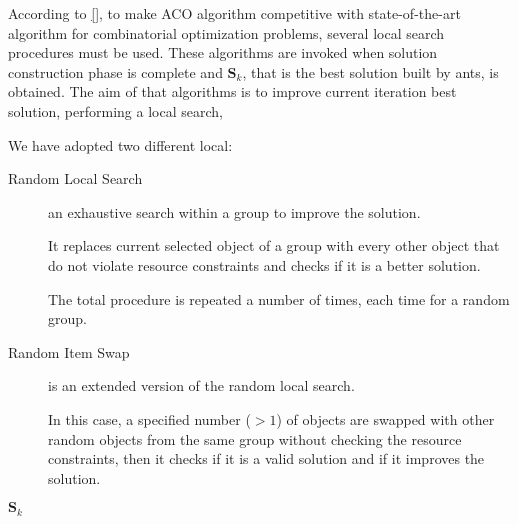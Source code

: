 \documentclass[12pt,a4paper]{report}
\theoremstyle{definition}
\begin{document}
According to \ref{}, to make ACO algorithm competitive with  state-of-the-art algorithm for combinatorial optimization problems, several local search procedures must be used. These algorithms are invoked when solution construction phase is complete and $\textbf{S}_k$, that is the best solution built by ants, is obtained. The aim of that algorithms is to improve current iteration best solution, performing a local search, 

We have adopted two different local:

\begin{description}
	\item[Random Local Search]  an exhaustive search within a group to improve the solution. 
	
	It replaces current selected object of a group with every other object that do not violate resource constraints and checks if it is a better solution. 
	
	The total procedure is repeated a number of times, each time for a random group.
	
	\item[Random Item Swap] is an extended version of the
	random local search. 
	
	In this case, a specified number ($> 1$) of objects are swapped with other random objects from the same group without checking the resource constraints, then it checks if it is a valid solution and if it improves the solution.
\end{description}

\begin{algorithm}
	
	\Return $\textbf{S}_k$
\end{algorithm}
\end{document}

